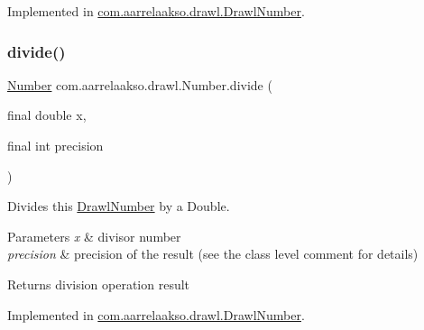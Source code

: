 Implemented in \hyperlink{classcom_1_1aarrelaakso_1_1drawl_1_1_drawl_number_a24ee9901f4d84a2fc086d4e727bf40c7}{com.\+aarrelaakso.\+drawl.\+Drawl\+Number}.

\mbox{\label{interfacecom_1_1aarrelaakso_1_1drawl_1_1_number_aa4a70324e7a3dfd7da7fae72cb7fe5b5}} 
\subsubsection{\texorpdfstring{divide()}{divide()}\hspace{0.1cm}{\footnotesize\ttfamily [3/3]}}
{\footnotesize\ttfamily \hyperlink{interfacecom_1_1aarrelaakso_1_1drawl_1_1_number}{Number} com.\+aarrelaakso.\+drawl.\+Number.\+divide (\begin{DoxyParamCaption}\item[{final double}]{x,  }\item[{final int}]{precision }\end{DoxyParamCaption})}



Divides this \hyperlink{classcom_1_1aarrelaakso_1_1drawl_1_1_drawl_number}{Drawl\+Number} by a Double. 


\begin{DoxyParams}{Parameters}
{\em x} & divisor number \\
\hline
{\em precision} & precision of the result (see the class level comment for details) \\
\hline
\end{DoxyParams}
\begin{DoxyReturn}{Returns}
division operation result 
\end{DoxyReturn}


Implemented in \hyperlink{classcom_1_1aarrelaakso_1_1drawl_1_1_drawl_number_a4ba0f1728e95fe494d440c04228041f7}{com.\+aarrelaakso.\+drawl.\+Drawl\+Number}.

\mbox{\label{interfacecom_1_1aarrelaakso_1_1drawl_1_1_number_abf7f5f2ea47601b2dbf399c68e4bf895}} 
